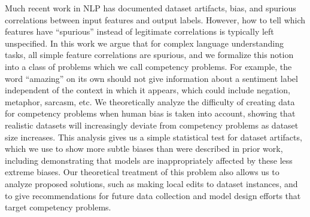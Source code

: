 Much recent work in NLP has documented dataset artifacts, bias, and spurious correlations between input features and output labels.  However, how to tell which features have ``spurious'' instead of legitimate correlations is typically left unspecified.  In this work we argue that for complex language understanding tasks, all simple feature correlations are spurious, and we formalize this notion into a class of problems which we call competency problems.  For example, the word ``amazing'' on its own should not give information about a sentiment label independent of the context in which it appears, which could include negation, metaphor, sarcasm, etc.  We theoretically analyze the difficulty of creating data for competency problems when human bias is taken into account, showing that realistic datasets will increasingly deviate from competency problems as dataset size increases.  This analysis gives us a simple statistical test for dataset artifacts, which we use to show more subtle biases than were described in prior work, including demonstrating that models are inappropriately affected by these less extreme biases.  Our theoretical treatment of this problem also allows us to analyze proposed solutions, such as making local edits to dataset instances, and to give recommendations for future data collection and model design efforts that target competency problems.
